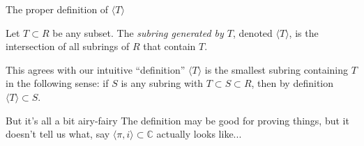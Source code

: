 \documentclass{beamer}
\begin{document}

\begin{frame}{The proper definition of $\langle T\rangle$}

\begin{definition} Let $T\subset R$ be any subset.  The \emph{subring generated by $T$}, denoted $\langle T\rangle$, is the intersection of all subrings of $R$ that contain $T$.
\end{definition}

\begin{block}{This agrees with our intuitive ``definition''}
$\langle T\rangle $ is the smallest subring containing $T$ in the following sense: if $S$ is any subring with $T\subset S\subset R$, then by definition $\langle T\rangle \subset S$.
\end{block}

\begin{block}{But it's all a bit airy-fairy}
The definition may be good for proving things, but it doesn't tell us what, say $\langle \pi, i \rangle \subset \mathbb{C}$ actually looks like...
\end{block}


\end{frame}
\end{document}
